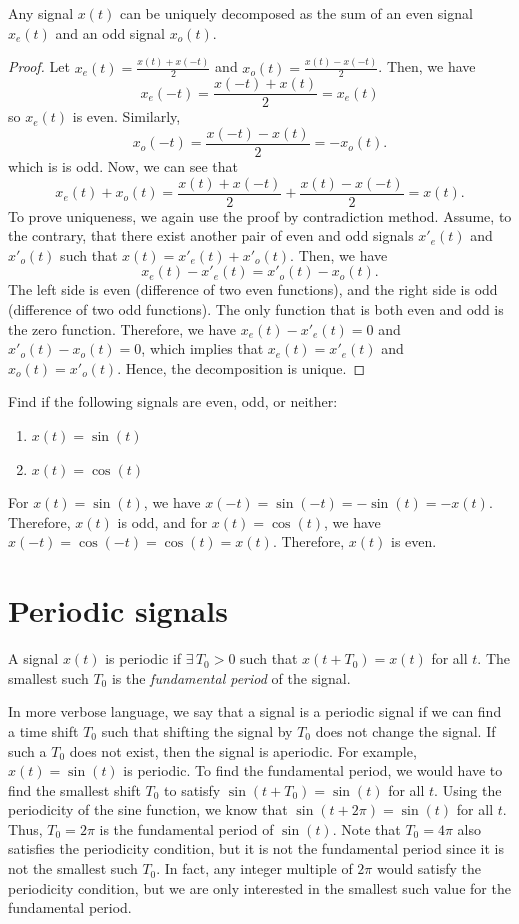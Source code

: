 \begin{proposition}
    Any signal $x(t)$ can be uniquely decomposed as the sum of an even signal $x_e(t)$ and an odd signal $x_o(t)$.
\end{proposition}
\begin{proof}
    Let $x_e(t)=\frac{x(t)+x(-t)}{2}$ and $x_o(t)=\frac{x(t)-x(-t)}{2}$. Then, we have
    \[
    x_e(-t) = \frac{x(-t) + x(t)}{2} = x_e(t)
    \]
    so $x_e(t)$ is even. Similarly,
    \[
    x_o(-t) = \frac{x(-t) - x(t)}{2} = -x_o(t).
    \]
    which is is odd. Now, we can see that
    \[
    x_e(t) + x_o(t) = \frac{x(t) + x(-t)}{2} + \frac{x(t) - x(-t)}{2} = x(t).
    \]
    To prove uniqueness, we again use the proof by contradiction method. Assume, to the contrary, that there exist another pair of even and odd signals $x'_e(t)$ and $x'_o(t)$ such that $x(t) = x'_e(t) + x'_o(t)$. Then, we have
    \[
    x_e(t) - x'_e(t) = x'_o(t) - x_o(t).
    \]
    The left side is even (difference of two even functions), and the right side is odd (difference of two odd functions). The only function that is both even and odd is the zero function. Therefore, we have $x_e(t) - x'_e(t) = 0$ and $x'_o(t) - x_o(t) = 0$, which implies that $x_e(t) = x'_e(t)$ and $x_o(t) = x'_o(t)$. Hence, the decomposition is unique.
\end{proof}
\begin{popquiz}
Find if the following signals are even, odd, or neither:
\begin{enumerate}
    \item \(x(t) = \sin(t)\)
    \item \(x(t) = \cos(t)\)
\end{enumerate}
\popqsplit
For \(x(t) = \sin(t)\), we have \(x(-t) = \sin(-t) = -\sin(t) = -x(t)\). Therefore, \(x(t)\) is odd, and for \(x(t) = \cos(t)\), we have \(x(-t) = \cos(-t) = \cos(t) = x(t)\). Therefore, \(x(t)\) is even.
\end{popquiz}

\section{Periodic signals}
\begin{definition}
    A signal $x(t)$ is periodic if $\exists\,T_0>0$ such that $x(t+T_0)=x(t)$ for all $t$. The smallest such $T_0$ is the \emph{fundamental period} of the signal.
\end{definition}
In more verbose language, we say that a signal is a periodic signal if we can find a time shift $T_0$ such that shifting the signal by $T_0$ does not change the signal. If such a $T_0$ does not exist, then the signal is aperiodic. For example, $x(t)=\sin(t)$ is periodic. To find the fundamental period, we would have to find the smallest shift $T_0$ to satisfy $\sin(t+T_0)=\sin(t)$ for all $t$. Using the periodicity of the sine function, we know that $\sin(t+2\pi)=\sin(t)$ for all $t$. Thus, $T_0=2\pi$ is the fundamental period of $\sin(t)$. Note that $T_0=4\pi$ also satisfies the periodicity condition, but it is not the fundamental period since it is not the smallest such $T_0$. In fact, any integer multiple of $2\pi$ would satisfy the periodicity condition, but we are only interested in the smallest such value for the fundamental period. 

